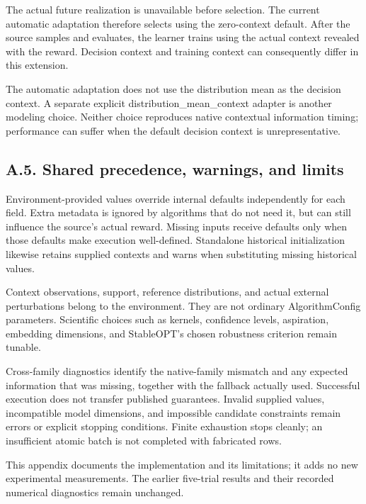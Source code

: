 \documentclass[10pt,a4paper]{article}
\begin{document}
The actual future realization is unavailable before selection. The current automatic adaptation therefore selects using the zero-context default. After the source samples and evaluates,\allowbreak{} the learner trains using the actual context revealed with the reward. Decision context and training context can consequently differ in this extension.


The automatic adaptation does not use the distribution mean as the decision context. A separate explicit distribution\_\allowbreak{}mean\_\allowbreak{}context adapter is another modeling choice. Neither choice reproduces native contextual information timing; performance can suffer when the default decision context is unrepresentative.


\subsection*{A.5. Shared precedence,\allowbreak{} warnings,\allowbreak{} and limits}

Environment-provided values override internal defaults independently for each field. Extra metadata is ignored by algorithms that do not need it,\allowbreak{} but can still influence the source's actual reward. Missing inputs receive defaults only when those defaults make execution well-defined. Standalone historical initialization likewise retains supplied contexts and warns when substituting missing historical values.


Context observations,\allowbreak{} support,\allowbreak{} reference distributions,\allowbreak{} and actual external perturbations belong to the environment. They are not ordinary AlgorithmConfig parameters. Scientific choices such as kernels,\allowbreak{} confidence levels,\allowbreak{} aspiration,\allowbreak{} embedding dimensions,\allowbreak{} and StableOPT's chosen robustness criterion remain tunable.


Cross-family diagnostics identify the native-family mismatch and any expected information that was missing,\allowbreak{} together with the fallback actually used. Successful execution does not transfer published guarantees. Invalid supplied values,\allowbreak{} incompatible model dimensions,\allowbreak{} and impossible candidate constraints remain errors or explicit stopping conditions. Finite exhaustion stops cleanly; an insufficient atomic batch is not completed with fabricated rows.


This appendix documents the implementation and its limitations; it adds no new experimental measurements. The earlier five-trial results and their recorded numerical diagnostics remain unchanged.
\end{document}
